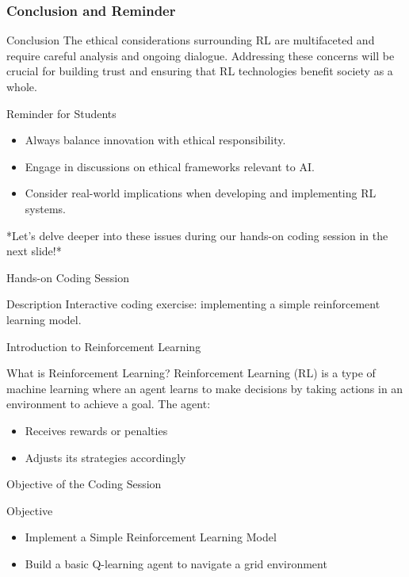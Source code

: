 \documentclass[aspectratio=169]{beamer}
\begin{document}
\begin{frame}[fragile]
    \frametitle{Conclusion and Reminder}
    \begin{block}{Conclusion}
        The ethical considerations surrounding RL are multifaceted and require careful analysis and ongoing dialogue. Addressing these concerns will be crucial for building trust and ensuring that RL technologies benefit society as a whole.
    \end{block}
    
    \begin{block}{Reminder for Students}
        \begin{itemize}
            \item Always balance innovation with ethical responsibility.
            \item Engage in discussions on ethical frameworks relevant to AI.
            \item Consider real-world implications when developing and implementing RL systems.
        \end{itemize}
    \end{block}
    
    *Let’s delve deeper into these issues during our hands-on coding session in the next slide!*
\end{frame}

\begin{frame}{Hands-on Coding Session}
    \begin{block}{Description}
        Interactive coding exercise: implementing a simple reinforcement learning model.
    \end{block}
\end{frame}

\begin{frame}{Introduction to Reinforcement Learning}
    \begin{block}{What is Reinforcement Learning?}
        Reinforcement Learning (RL) is a type of machine learning where an agent learns to make decisions by taking actions in an environment to achieve a goal. The agent:
        \begin{itemize}
            \item Receives rewards or penalties
            \item Adjusts its strategies accordingly
        \end{itemize}
    \end{block}
\end{frame}

\begin{frame}{Objective of the Coding Session}
    \begin{block}{Objective}
        \begin{itemize}
            \item Implement a Simple Reinforcement Learning Model
            \item Build a basic Q-learning agent to navigate a grid environment
        \end{itemize}
    \end{block}
\end{frame}
\end{document}
